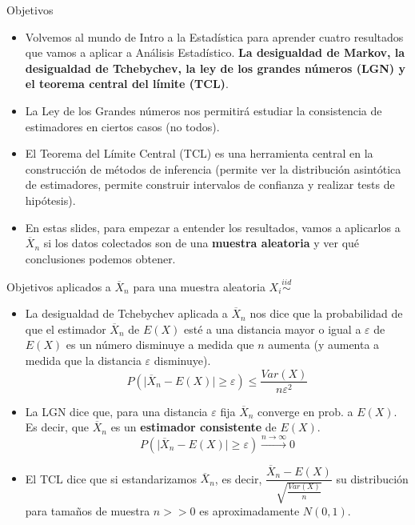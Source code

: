 \documentclass{beamer}
\title{\color{black}{Análisis Estadístico}}
\subtitle{\color{rosee}Desigualdades de Markov y Tchebychev, LGN y TCL}
\author[Introducción]{}
\institute[]{UTDT}
\date[UTDT 2021]{}
\theoremstyle{definition}
\newcommand{\eps}{\varepsilon}
\begin{document}
\begin{frame}
  \titlepage
\end{frame}

\begin{frame}{\color{rosee}Objetivos}\small
\begin{itemize}
    \item Volvemos al mundo de Intro a la Estadística para aprender cuatro resultados que vamos a aplicar a Análisis Estadístico. \textbf{La desigualdad de Markov, la desigualdad de Tchebychev, la ley de los grandes números (LGN) y el teorema central del límite (TCL)}.
    
    \item La Ley de los Grandes números nos permitirá estudiar la consistencia de estimadores en ciertos casos (no todos).
    
    \item El Teorema del Límite Central (TCL) es una herramienta central en la construcción de métodos de inferencia (permite ver la distribución asintótica de estimadores, permite construir intervalos de confianza y realizar tests de hipótesis).
    
    \item En estas slides, para empezar a entender los resultados, vamos a aplicarlos a $\overline{X}_n$ si los datos colectados son de una \textbf{muestra aleatoria} y ver qué conclusiones podemos obtener.
    
\end{itemize}
\end{frame}

\begin{frame}{\color{rosee}Objetivos aplicados a $\overline{X}_n$ para una muestra aleatoria $X_i\stackrel{iid}{\sim}$}\small
\begin{itemize}
\item La desigualdad de Tchebychev aplicada a $\overline{X}_n$ nos dice que la probabilidad de que el estimador $\overline{X}_n$ de $E(X)$ esté a una distancia mayor o igual a $\eps$ de $E(X)$ es un número disminuye a medida que $n$ aumenta (y aumenta a medida que la distancia $\eps$ disminuye).
\[P(\vert \overline{X}_n-E(X)\vert \geq \eps)\leq \dfrac{Var(X)}{n\eps^2}\]

\item La LGN dice que, para una distancia $\eps$ fija $\overline{X}_n$ converge en prob. a $E(X)$. Es decir, que $\overline{X}_n$ es un \textbf{estimador consistente} de $E(X)$.
\[P(\vert \overline{X}_n-E(X)\vert \geq \eps)\stackrel{n\to \infty}{\rightarrow}0\]

\item El TCL dice que si estandarizamos $\overline{X}_n$, es decir, $\dfrac{\overline{X}_n -E(X)}{\sqrt{\frac{Var(X)}{n}}}$ su distribución para tamaños de muestra $n>>0$ es aproximadamente $N(0,1)$.
\end{itemize}
\end{frame}
\end{document}

